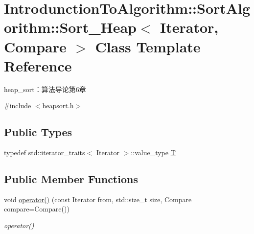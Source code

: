 \hypertarget{class_introdunction_to_algorithm_1_1_sort_algorithm_1_1_sort___heap}{}\section{Introdunction\+To\+Algorithm\+:\+:Sort\+Algorithm\+:\+:Sort\+\_\+\+Heap$<$ Iterator, Compare $>$ Class Template Reference}
\label{class_introdunction_to_algorithm_1_1_sort_algorithm_1_1_sort___heap}


heap\+\_\+sort：算法导论第6章  




{\ttfamily \#include $<$heapsort.\+h$>$}

\subsection*{Public Types}
\begin{DoxyCompactItemize}
\item 
typedef std\+::iterator\+\_\+traits$<$ Iterator $>$\+::value\+\_\+type \hyperlink{class_introdunction_to_algorithm_1_1_sort_algorithm_1_1_sort___heap_a919579152d685b356d4776fc8d2eeb90}{T}
\end{DoxyCompactItemize}
\subsection*{Public Member Functions}
\begin{DoxyCompactItemize}
\item 
void \hyperlink{class_introdunction_to_algorithm_1_1_sort_algorithm_1_1_sort___heap_a3c6f55939475aac8e7651248230e1730}{operator()} (const Iterator from, std\+::size\+\_\+t size, Compare compare=Compare())
\begin{DoxyCompactList}\small\item\em operator() \end{DoxyCompactList}\end{DoxyCompactItemize}
